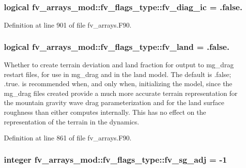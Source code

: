 \subsubsection[{fv\-\_\-diag\-\_\-ic}]{\setlength{\rightskip}{0pt plus 5cm}logical fv\-\_\-arrays\-\_\-mod\-::fv\-\_\-flags\-\_\-type\-::fv\-\_\-diag\-\_\-ic = .false.}\label{structfv__arrays__mod_1_1fv__flags__type_abfbf7d7bd8fd7655bdae79c3c8a28729}


Definition at line 901 of file fv\-\_\-arrays.\-F90.

\subsubsection[{fv\-\_\-land}]{\setlength{\rightskip}{0pt plus 5cm}logical fv\-\_\-arrays\-\_\-mod\-::fv\-\_\-flags\-\_\-type\-::fv\-\_\-land = .false.}\label{structfv__arrays__mod_1_1fv__flags__type_ac4156a48b9e2d608c378b8ec882fe2e3}


Whether to create terrain deviation and land fraction for output to mg\-\_\-drag restart files, for use in mg\-\_\-drag and in the land model. The default is .false; .true. is recommended when, and only when, initializing the model, since the mg\-\_\-drag files created provide a much more accurate terrain representation for the mountain gravity wave drag parameterization and for the land surface roughness than either computes internally. This has no effect on the representation of the terrain in the dynamics. 



Definition at line 861 of file fv\-\_\-arrays.\-F90.

\subsubsection[{fv\-\_\-sg\-\_\-adj}]{\setlength{\rightskip}{0pt plus 5cm}integer fv\-\_\-arrays\-\_\-mod\-::fv\-\_\-flags\-\_\-type\-::fv\-\_\-sg\-\_\-adj = -\/1}\label{structfv__arrays__mod_1_1fv__flags__type_a9c0bc226ee0b31ea4e9454e4d5ddd518}


